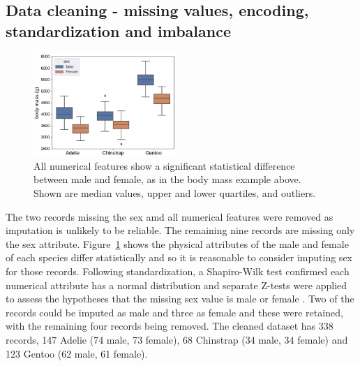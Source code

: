 \documentclass[12pt]{article}
\begin{document}
\vspace{\baselineskip}
\subsection*{Data cleaning - missing values, encoding, standardization and imbalance}

\begin{figure} %
  \centering
  \vspace{-1.5\baselineskip} %
  \includegraphics[width=0.48\textwidth]{sex.png} %
  \vspace{-0.5\baselineskip} %
  \caption{\centering\linespread{0.8}\selectfont All numerical features show a significant statistical difference between male and female, 
  as in the body mass example above. Shown are median values, upper and lower quartiles, 
  and outliers.}
  \vspace{-0.5\baselineskip} %
  \label{fig:sex}
\end{figure}   

The two records missing the sex amd all numerical features were removed as imputation is unlikely to be reliable. 
The remaining nine records are missing only the sex attribute. Figure~\ref{fig:sex} shows the physical 
attributes of the male and female of each species differ statistically and so it is reasonable to 
consider imputing sex for those records. Following standardization, 
a Shapiro-Wilk test confirmed each numerical attribute has a normal distribution \cite{shapiro1965analysis} 
and separate Z-tests were applied to assess the 
hypotheses that the missing sex value is male or female \cite{freedman2007statistics}. 
Two of the records could be imputed as male and three as female 
and these were retained, with the remaining four records being removed. 
The cleaned dataset has 338 records, 147 Adelie  
(74 male, 73 female), 68 Chinstrap (34 male, 34 female) and 123 Gentoo (62 male, 61 female).
\end{document}
